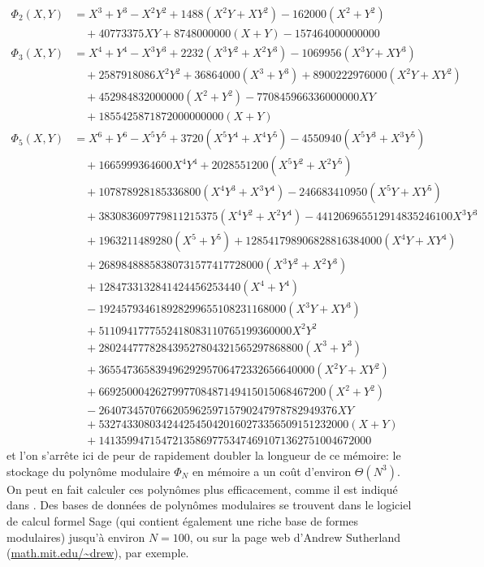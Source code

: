 \documentclass[11pt,a4paper]{article}
\theoremstyle{definition}
\begin{document}
$$\begin{aligned}
\Phi_2(X, Y) &=  X^3 + Y^3 - X^2 Y^2 + 1488(X^2Y + X Y^2)  - 162000(X^2 + Y^2) \\
&\quad + 40773375 XY  + 8748000000(X + Y) - 157464000000000\\
\Phi_3(X, Y) &= X^4 + Y^4 - X^3 Y^3 + 2232(X^3 Y^2 + X^2 Y^3) - 1069956(X^3 Y + X Y^3)\\
&\quad + 2587918086 X^2 Y^2  + 36864000(X^3 + Y^3) + 8900222976000(X^2 Y + X Y^2)  \\
&\quad + 452984832000000(X^2 + Y^2) - 770845966336000000 XY \\
&\quad + 1855425871872000000000(X + Y)\\
\Phi_5(X, Y) &= X^6 + Y^6 -X^5 Y^5 + 3720(X^5 Y^4 + X^4 Y^5) - 4550940(X^5 Y^3 + X^3 Y^5) \\
&\quad + 1665999364600 X^4 Y^4 + 2028551200(X^5 Y^2 + X^2 Y^5) \\
&\quad + 107878928185336800(X^4 Y^3 + X^3 Y^4) - 246683410950(X^5 Y + X Y^5) \\
&\quad + 383083609779811215375(X^4 Y^2 + X^2 Y^4) - 441206965512914835246100 X^3 Y^3 \\
&\quad + 1963211489280(X^5 + Y^5) + 128541798906828816384000(X^4 Y + X Y^4) \\
&\quad + 26898488858380731577417728000(X^3 Y^2 + X^2 Y^3) \\
&\quad +  1284733132841424456253440(X^4 + Y^4) \\
&\quad - 192457934618928299655108231168000(X^3 Y + X Y^3) \\
&\quad + 5110941777552418083110765199360000 X^2 Y^2 \\
&\quad + 280244777828439527804321565297868800(X^3 + Y^3) \\
&\quad + 36554736583949629295706472332656640000(X^2 Y + X Y^2) \\
&\quad + 6692500042627997708487149415015068467200( X^2 + Y^2) \\
&\quad - 264073457076620596259715790247978782949376 XY \\
&\quad + 53274330803424425450420160273356509151232000(X + Y) \\
&\quad + 141359947154721358697753474691071362751004672000
\end{aligned}$$
et l'on s'arrête ici de peur de rapidement doubler la longueur de ce mémoire: le stockage du polynôme modulaire $\Phi_N$ en mémoire a un coût d'environ $\Theta(N^3)$. On peut en fait calculer ces polynômes plus efficacement, comme il est indiqué dans \cite{Elkies}.
Des bases de données de polynômes modulaires se trouvent dans le logiciel de calcul formel Sage \cite{Sage} (qui contient également une riche base de formes modulaires) jusqu'à environ $N = 100$, ou sur la page web d'Andrew Sutherland (\url{math.mit.edu/~drew}), par exemple.
\end{document}

